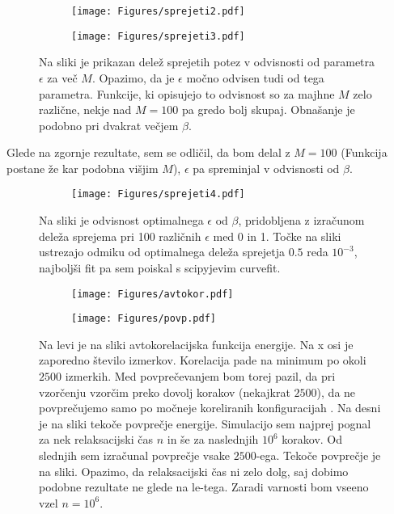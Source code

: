 \documentclass{article}
\begin{document}
\begin{figure}[H]
\centering
\begin{subfigure}{.49\textwidth}
\texttt{[image: Figures/sprejeti2.pdf]}
\end{subfigure}
\begin{subfigure}{.49\textwidth}
\texttt{[image: Figures/sprejeti3.pdf]}
\end{subfigure}
\caption*{Na sliki je prikazan delež sprejetih potez v odvisnosti od parametra $\epsilon$ za več $M$. Opazimo, da je $\epsilon$ močno odvisen tudi od tega parametra. Funkcije, ki opisujejo to odvisnost so za majhne $M$ zelo različne, nekje nad $M=100$ pa gredo bolj skupaj. Obnašanje je podobno pri dvakrat večjem $\beta$. }
\end{figure}

Glede na zgornje rezultate, sem se odličil, da bom delal z $M=100$ (Funkcija postane že kar podobna višjim $M$), $\epsilon$ pa spreminjal v odvisnosti od $\beta$.

\begin{figure}[H]
\centering
\begin{subfigure}{\textwidth}
\texttt{[image: Figures/sprejeti4.pdf]}
\end{subfigure}
\caption*{Na sliki je odvisnost optimalnega $\epsilon$ od $\beta$, pridobljena z izračunom deleža sprejema pri 100 različnih $\epsilon$ med 0 in 1. Točke na sliki ustrezajo odmiku od optimalnega deleža sprejetja $0.5$ reda $10^{-3}$, najboljši fit pa sem poiskal s scipyjevim curvefit. }
\end{figure}

\begin{figure}[H]
\centering
\begin{subfigure}{.49\textwidth}
\texttt{[image: Figures/avtokor.pdf]}
\end{subfigure}
\begin{subfigure}{.49\textwidth}
\texttt{[image: Figures/povp.pdf]}
\end{subfigure}
\caption*{Na levi je na sliki  avtokorelacijska funkcija energije. Na x osi je zaporedno število izmerkov. Korelacija pade na minimum po okoli $2500$ izmerkih. Med povprečevanjem bom torej pazil, da pri vzorčenju vzorčim preko dovolj korakov (nekajkrat $2500$), da ne povprečujemo samo po močneje koreliranih konfiguracijah . Na desni je na sliki tekoče povprečje energije. Simulacijo sem najprej pognal za nek relaksacijski čas $n$ in še za naslednjih $10^6$ korakov. Od slednjih sem izračunal povprečje vsake $2500$-ega. Tekoče povprečje je na sliki. Opazimo, da relaksacijski čas ni zelo dolg, saj dobimo podobne rezultate ne glede na le-tega. Zaradi varnosti bom vseeno vzel $n=10^6$.}
\end{figure}
\end{document}
